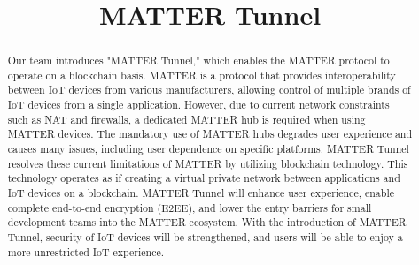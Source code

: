 \documentclass[conference]{IEEEtran}
\begin{document}
\title{MATTER Tunnel}

\author{
\and
{}
\and
{}
\and
{}
}
\maketitle

\begin{abstract}
Our team introduces "MATTER Tunnel," which enables the MATTER protocol to operate on a blockchain basis. MATTER is a protocol that provides interoperability between IoT devices from various manufacturers, allowing control of multiple brands of IoT devices from a single application. However, due to current network constraints such as NAT and firewalls, a dedicated MATTER hub is required when using MATTER devices.
The mandatory use of MATTER hubs degrades user experience and causes many issues, including user dependence on specific platforms. MATTER Tunnel resolves these current limitations of MATTER by utilizing blockchain technology. This technology operates as if creating a virtual private network between applications and IoT devices on a blockchain.
MATTER Tunnel will enhance user experience, enable complete end-to-end encryption (E2EE), and lower the entry barriers for small development teams into the MATTER ecosystem. With the introduction of MATTER Tunnel, security of IoT devices will be strengthened, and users will be able to enjoy a more unrestricted IoT experience.
\end{abstract}
\end{document}
